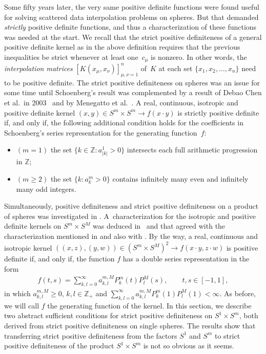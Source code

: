 \documentclass[11pt]{article}
\numberwithin{equation}{section}
\begin{document}
Some f\/ifty years later, the very same positive def\/inite functions were found useful for solving scattered data interpolation problems on spheres. But that demanded {\em strictly} positive def\/inite functions, and thus a characterization of these functions was needed at the start. We recall that the strict positive def\/initeness of a general positive def\/inite kernel as in the above def\/inition requires that the previous inequalities be strict whenever at least one~$c_\mu$ is nonzero. In other words, the {\em interpolation matrices} $[K(x_\mu , x_\nu)]_{\mu,\nu=1}^n$ of~$K$ at each set $\{x_1, x_2, \ldots, x_n\}$ need to be positive def\/inite. The strict positive def\/initeness on spheres was an issue for some time until Schoenberg's result was complemented by a result of Debao Chen et al.\ in 2003~\cite{chen} and by Menegatto et al.~\cite{menegatto}. A real, continuous, isotropic and positive def\/inite kernel $(x,y) \in S^m \times S^m \to f(x \cdot y)$ is strictly positive def\/inite if, and only if, the following additional condition holds for the coef\/f\/icients in Schoenberg's series representation for the generating function~$f$:
\begin{itemize}\itemsep=0pt
\item[--] $(m=1)$ the set $\{k \in \mathbb{Z}\colon a_{|k|}^1>0\}$ intersects each full arithmetic progression in $\mathbb{Z}$;
\item[--] $(m\geq 2)$ the set $\{k \colon a_k^m >0\}$ contains inf\/initely many even and inf\/initely many odd integers.
\end{itemize}
\setcounter{section}{1}
\setcounter{subsection}{0}
\setcounter{subsubsection}{0}
\setcounter{Theorem}{0}
\setcounter{equation}{0}
Simultaneously, positive def\/initeness and strict positive def\/initeness on a product of spheres was investigated in \cite{jean0,jean,jean1}. A~characterization for the isotropic and positive def\/inite kernels on $S^m \times S^M$ was deduced in~\cite{jean} and that agreed with the characterization mentioned in \cite{berg} and also with \cite[Chapter~4]{shapiro}. By the way, a real, continuous and isotropic kernel $((x,z), (y,w)) \in (S^m \times S^M)^2 \to f(x \cdot y, z \cdot w)$ is positive def\/inite if, and only if, the function $f$ has a double series representation in the form
\begin{gather}\label{requ}
f(t,s) = \sum_{k,l=0}^{\infty}a_{k,l}^{m,M}P_{k}^{m}(t)P_{l}^{M}(s), \qquad t,s \in [-1,1],
\end{gather}
in which $a_{k,l}^{m,M}\geq 0$, $k,l\in \mathbb{Z}_+$ and $\sum\limits_{k,l=0}^{\infty}a_{k,l}^{m,M}P_{k}^{m}(1)P_{l}^{M}(1)<\infty$. As before, we will call $f$ the generating function of the kernel.
\setcounter{section}{2}
\setcounter{subsection}{0}
\setcounter{subsubsection}{0}
\setcounter{Theorem}{0}
\setcounter{equation}{0}
In this section, we describe two abstract suf\/f\/icient conditions for strict positive def\/initeness on $S^1 \times S^m$, both derived from strict positive def\/initeness on single spheres. The results show that transferring strict positive def\/initeness from the factors $S^1$ and $S^m$ to strict positive def\/initeness of the product $S^1 \times S^m$ is not so obvious as it seems.
\end{document}
